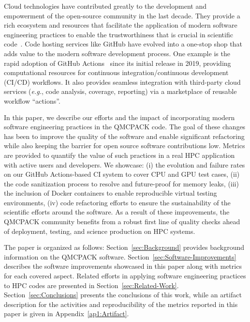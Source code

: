 Cloud technologies have contributed greatly to the development and empowerment of the open-source community in the last decade. They provide a rich ecosystem and resources that facilitate the application of modern software engineering practices to enable the trustworthiness that is crucial in scientific code~\cite{fox2011cloud}. Code hosting services like GitHub have evolved into a one-stop shop that adds value to the modern software development process. One example is the rapid adoption of GitHub Actions~\cite{decan2022use} since its initial release in 2019, providing computational resources for continuous
integration/continuous development (CI/CD) workflows. It also provides seamless integration with third-party cloud services
(\textit{e.g.}, code analysis, coverage, reporting) via a marketplace of reusable workflow ``actions''.

In this paper, we describe our efforts and the impact of incorporating modern software engineering practices in the QMCPACK code. The goal of these changes has been to
improve the quality of the software and enable significant refactoring while also keeping the barrier for open source software contributions low.
Metrics are provided to quantify the value of such practices in a real HPC application with active users and developers. We showcase: (i) the evolution
and failure rates on our GitHub Actions-based CI system to cover CPU and GPU test cases, (ii) the code sanitization process to
resolve and future-proof for memory leaks, (iii) the inclusion of Docker containers to enable reproducible virtual testing
environments, (iv) code refactoring efforts to ensure the sustainability of the scientific efforts around the software. As a result of these improvements, the QMCPACK community benefits from a robust first line of quality checks ahead of deployment, testing, and science production on HPC systems.

The paper is organized as follows: Section~\ref{sec:Background} provides background information on the QMCPACK software.
Section~\ref{sec:Software-Improvements} describes the software improvements showcased in this paper along with metrics for each
covered aspect. Related efforts in applying software engineering practices to HPC codes are presented in Section~\ref{sec:Related-Work}. Section~\ref{sec:Conclusions} presents the conclusions of this work, while an artifact description
for the activities and reproducibility of the metrics reported in this paper is given in Appendix~\ref{ap1:Artifact}. 
